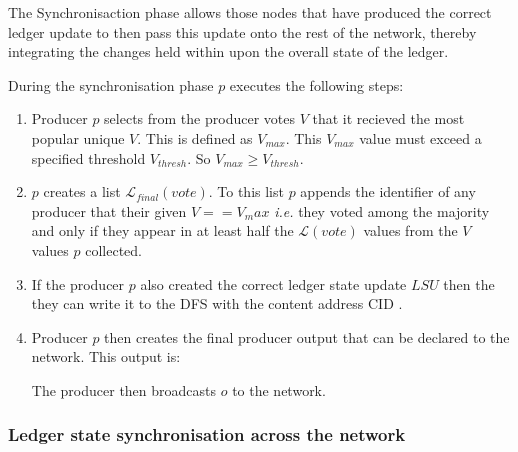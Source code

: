 The Synchronisaction phase allows those nodes that have produced the correct ledger update to then pass this update onto the rest of the network, thereby integrating the changes held within upon the overall state of the ledger. 

During the synchronisation phase $p$ executes the following steps:

\begin{enumerate}

\item Producer $p$ selects from the producer votes $V$ that it recieved the most popular unique $V$. This is defined as $V_{max}$. This $V_{max}$ value must exceed a specified threshold $V_{thresh}$. So $V_{max} \geq V_{thresh}$. %

\item $p$ creates a list $\mathcal{L}_{final}(vote)$. To this list $p$ appends the identifier of any producer that their given $V == V_max$ \textit{i.e.} they voted among the majority and only if they appear in at least half the $\mathcal{L}(vote)$ values from the $V$ values $p$ collected. 

\item If the producer $p$ also created the correct ledger state update $LSU$ then the they can write it to the DFS with the content address CID \cite{ADD LINK TO CID OBJ}. 

\item Producer $p$ then creates the final producer output that can be declared to the network. This output is:
\begin{center}
\label{eq:Hj}
\end{center}


The producer then broadcasts $o$ to the network.
\end{enumerate}



\subsubsection{Ledger state synchronisation across the network}

